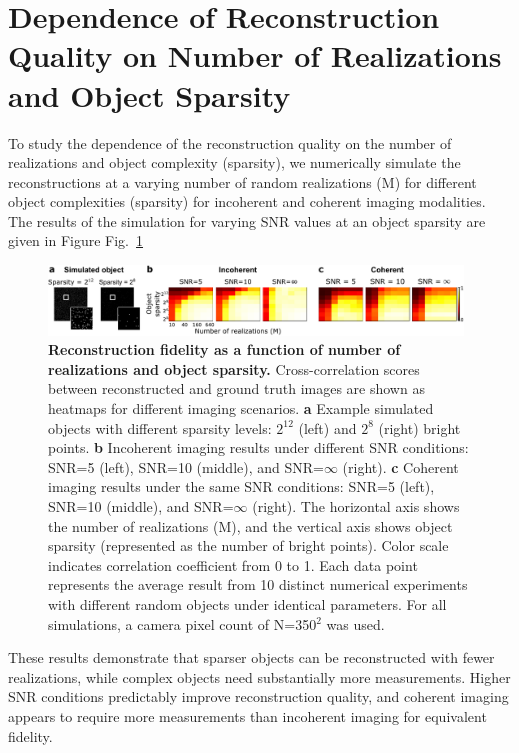 \documentclass[pdflatex,sn-mathphys-num,Numbered]{sn-jnl}%
\theoremstyle{thmstyleone}%
\theoremstyle{thmstyletwo}%
\theoremstyle{thmstylethree}%
\begin{document}
\newpage




\section{Dependence of Reconstruction Quality on Number of Realizations and Object Sparsity}

To study the dependence of the reconstruction quality on the number of realizations and object complexity (sparsity), we numerically simulate the reconstructions at a varying number of random realizations (M) for different object complexities (sparsity) for incoherent and coherent imaging modalities.
The results of the simulation for varying SNR values at an object sparsity are given in Figure Fig.~\ref{fig:convergence_heatmaps}

\begin{figure}[hbt!]
    \centering
    \includegraphics[width=0.98\textwidth]{supp_figures/figure_S8.pdf}
    \caption{\textbf{Reconstruction fidelity as a function of number of realizations and object sparsity.} 
    Cross-correlation scores between reconstructed and ground truth images are shown as heatmaps for different imaging scenarios. \textbf{a} Example simulated objects with different sparsity levels: $2^{12}$ (left) and $2^8$ (right) bright points. \textbf{b} Incoherent imaging results under different SNR conditions: SNR=5 (left), SNR=10 (middle), and SNR=$\infty$ (right). \textbf{c} Coherent imaging results under the same SNR conditions: SNR=5 (left), SNR=10 (middle), and SNR=$\infty$ (right). The horizontal axis shows the number of realizations (M), and the vertical axis shows object sparsity (represented as the number of bright points). Color scale indicates correlation coefficient from 0 to 1. Each data point represents the average result from 10 distinct numerical experiments with different random objects under identical parameters. For all simulations, a camera pixel count of N=350$^2$ was used.}
    \label{fig:convergence_heatmaps}
\end{figure}

These results demonstrate that sparser objects can be reconstructed with fewer realizations, while complex objects need substantially more measurements. Higher SNR conditions predictably improve reconstruction quality, and coherent imaging appears to require more measurements than incoherent imaging for equivalent fidelity.
\end{document}
